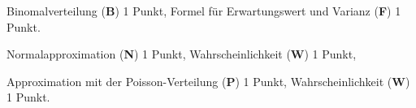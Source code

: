 \begin{bewertung}
Binomalverteilung ({\bf B}) 1 Punkt,
Formel für Erwartungswert und Varianz ({\bf F}) 1 Punkt.
\begin{teilaufgaben}
\item
Normalapproximation ({\bf N}) 1 Punkt,
Wahrscheinlichkeit ({\bf W}) 1 Punkt,
\item
Approximation mit der Poisson-Verteilung ({\bf P}) 1 Punkt,
Wahrscheinlichkeit ({\bf W}) 1 Punkt.
\end{teilaufgaben}
\end{bewertung}


